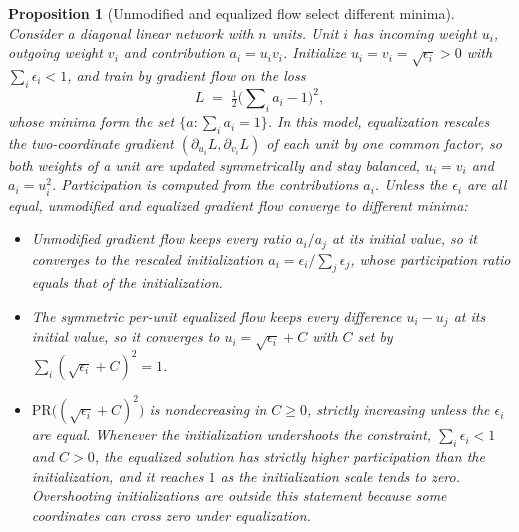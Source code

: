 \documentclass{article} %
\newtheorem{proposition}{Proposition}
\begin{document}
\begin{proposition}[Unmodified and equalized flow select different minima]
\label{prop:select}
Consider a diagonal linear network with $n$ units. Unit $i$ has incoming weight $u_i$, outgoing weight $v_i$ and contribution $a_i = u_i v_i$. Initialize $u_i = v_i = \sqrt{\epsilon_i} > 0$ with $\sum_i \epsilon_i < 1$, and train by gradient flow on the loss
\begin{equation}
L \;=\; \tfrac{1}{2}\Big(\sum\nolimits_i a_i - 1\Big)^{2},
\label{eq:toyloss}
\end{equation}
whose minima form the set $\{a : \sum_i a_i = 1\}$. In this model, equalization rescales the two-coordinate gradient $(\partial_{u_i} L, \partial_{v_i} L)$ of each unit by one common factor, so both weights of a unit are updated symmetrically and stay balanced, $u_i = v_i$ and $a_i = u_i^2$. Participation is computed from the contributions $a_i$. Unless the $\epsilon_i$ are all equal, unmodified and equalized gradient flow converge to different minima:
\begin{itemize}
\item[(i)] Unmodified gradient flow keeps every ratio $a_i / a_j$ at its initial value, so it converges to the rescaled initialization $a_i = \epsilon_i / \sum_j \epsilon_j$, whose participation ratio equals that of the initialization.
\item[(ii)] The symmetric per-unit equalized flow keeps every difference $u_i - u_j$ at its initial value, so it converges to $u_i = \sqrt{\epsilon_i} + C$ with $C$ set by $\sum_i (\sqrt{\epsilon_i} + C)^2 = 1$.
\item[(iii)] $\mathrm{PR}\big((\sqrt{\epsilon_i} + C)^2\big)$ is nondecreasing in $C \geq 0$, strictly increasing unless the $\epsilon_i$ are equal. Whenever the initialization undershoots the constraint, $\sum_i \epsilon_i < 1$ and $C > 0$, the equalized solution has strictly higher participation than the initialization, and it reaches $1$ as the initialization scale tends to zero. Overshooting initializations are outside this statement because some coordinates can cross zero under equalization.
\end{itemize}
\end{proposition}
\end{document}
